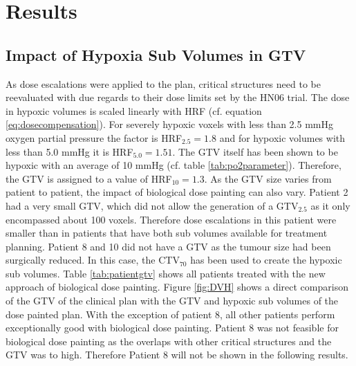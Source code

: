 \section{Results}
\subsection{Impact of Hypoxia Sub Volumes in GTV}
As dose escalations were applied to the plan, critical structures need to be reevaluated with due regards to their dose limits set by the HN06 trial. The dose in hypoxic volumes is scaled linearly with HRF (cf. equation \ref{eq:dosecompensation}). For severely hypoxic voxels with less than 2.5 mmHg oxygen partial pressure the factor is HRF$_{2.5}=1.8$ and for hypoxic volumes with less than 5.0 mmHg it is HRF$_{5.0}=1.51$. The GTV itself has been shown to be hypoxic with an average of 10 mmHg (cf. table \ref{tab:po2parameter}). Therefore, the GTV is assigned to a value of HRF$_\mathrm{10}=1.3$. As the GTV size varies from patient to patient, the impact of biological dose painting can also vary. Patient 2 had a very small GTV, which did not allow the generation of a GTV$_{2.5}$ as it only encompassed about 100 voxels. Therefore dose escalations in this patient were smaller than in patients that have both sub volumes available for treatment planning. Patient 8 and 10 did not have a GTV as the tumour size had been surgically reduced. In this case, the CTV$_{70}$ has been used to create the hypoxic sub volumes. Table \ref{tab:patientgtv} shows all patients treated with the new approach of biological dose painting. Figure \ref{fig:DVH} shows a direct comparison of the GTV of the clinical plan with the GTV and hypoxic sub volumes of the dose painted plan. With the exception of patient 8, all other patients perform exceptionally good with biological dose painting. Patient 8 was not feasible for biological dose painting as the overlaps with other critical structures and the GTV was to high. Therefore Patient 8 will not be shown in the following results.
\begin{sidewaysfigure}[p]
\centering
{}
\caption{Dose volume histograms for the GTV of the clinical plan (green) and all volumes from biological dose painting: GTV (red), GTV$_{5.0}$ (blue), GTV$_{2.5}$ (magenta). Patient 2 did not have a GTV$_{2.5}$ as the GTV was to small. Complete delivery is not possible to the GTV and hypoxic sub volumes. Desired dose values are $D_{2.5} = 126$ Gy for the 2.5 mmHg sub volume, $D_{5.0} = 105.7$ Gy for the 5.0 mmHg sub volume and $D_\mathrm{GTV} = 91$ Gy for the GTV which was assigned with 10 mmHg.}
\label{fig:DVH}
\end{sidewaysfigure}
